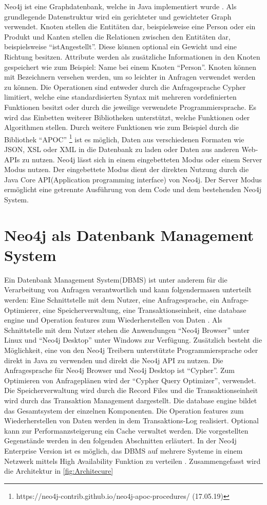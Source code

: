 Neo4j ist eine Graphdatenbank, welche in Java implementiert wurde \parencite{vukotic2015neo4j}. Als grundlegende Datenstruktur wird ein gerichteter und gewichteter Graph verwendet. Knoten stellen die Entitäten dar, beispielsweise eine Person oder ein Produkt und  Kanten stellen die Relationen zwischen den Entitäten dar, beispielsweise “istAngestellt”. Diese können optional ein Gewicht und eine Richtung besitzen. Attribute werden als zusätzliche Informationen in den Knoten gespeichert wie zum Beispiel: Name bei einem Knoten “Person”. Knoten können mit Bezeichnern versehen werden, um so leichter in Anfragen  verwendet werden zu können. Die Operationen sind entweder durch die  Anfragesprache  Cypher limitiert, welche eine standardisierten Syntax mit  mehreren vordefinierten Funktionen besitzt oder durch die jeweilige verwendete Programmiersprache. Es wird das Einbetten weiterer Bibliotheken unterstützt, welche  Funktionen oder Algorithmen stellen. Durch weitere Funktionen wie zum Beispiel durch die Bibliothek “APOC” \footnote{https://neo4j-contrib.github.io/neo4j-apoc-procedures/ (17.05.19) } ist es möglich, Daten aus verschiedenen Formaten wie JSON, XSL oder XML in die Datenbank zu laden oder Daten aus anderen Web-APIs zu nutzen. Neo4j lässt sich in einem  eingebetteten Modus oder einem  Server Modus nutzen. Der eingebettete Modus dient der direkten  Nutzung durch die Java Core API(Application programming interface)  von Neo4j. Der Server Modus ermöglicht eine getrennte Ausführung von dem Code und dem bestehenden Neo4j System. 

\section{Neo4j als Datenbank Management System}
Ein Datenbank Management System(DBMS) ist unter anderem für die Verarbeitung von Anfragen verantwortlich und kann folgendermasen unterteilt werden: Eine Schnittstelle mit dem Nutzer, eine Anfragesprache, ein Anfrage-Optimierer,  eine Speicherverwaltung, eine Transaktionseinheit, eine database engine und Operation features zum Wiederherstellen von Daten \parencite{angles2012comparison}. Als Schnittstelle mit dem Nutzer stehen die Anwendungen “Neo4j Browser” unter Linux und “Neo4j Desktop” unter Windows zur Verfügung.     Zusätzlich besteht die Möglichkeit, eine von den Neo4j Treibern unterstützte Programmiersprache  oder direkt in Java zu verwenden und direkt die Neo4j API zu nutzen. Die Anfragesprache für Neo4j Browser und Neo4j Desktop ist “Cypher”. Zum Optimieren von Anfrageplänen wird der “Cypher Query Optimizer”, verwendet. Die Speicherverwaltung wird durch die Record Files und die Transaktionseinheit  wird durch das Transaktion Management dargestellt. Die database engine bildet das Gesamtsystem der einzelnen Komponenten. Die Operation features zum Wiederherstellen von Daten werden in dem Transaktions-Log realisiert. Optional kann zur  Performanzsteigerung ein Cache verwaltet werden. Die vorgestellten Gegenstände werden in den folgenden Abschnitten erläutert. In der Neo4j Enterprise Version ist es möglich, das DBMS auf mehrere Systeme in einem Netzwerk mittels High Availability Funktion zu verteilen \parencite{vukotic2015neo4j}. Zusammengefasst wird die Architektur in \ref{fig:Architecure}

